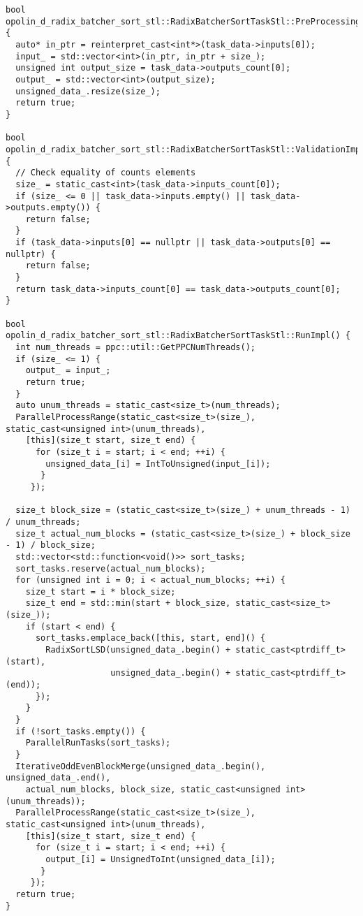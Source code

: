 \documentclass[12pt,a4paper]{extarticle}
\begin{document}
\begin{lstlisting}
bool opolin_d_radix_batcher_sort_stl::RadixBatcherSortTaskStl::PreProcessingImpl() {
  auto* in_ptr = reinterpret_cast<int*>(task_data->inputs[0]);
  input_ = std::vector<int>(in_ptr, in_ptr + size_);
  unsigned int output_size = task_data->outputs_count[0];
  output_ = std::vector<int>(output_size);
  unsigned_data_.resize(size_);
  return true;
}

bool opolin_d_radix_batcher_sort_stl::RadixBatcherSortTaskStl::ValidationImpl() {
  // Check equality of counts elements
  size_ = static_cast<int>(task_data->inputs_count[0]);
  if (size_ <= 0 || task_data->inputs.empty() || task_data->outputs.empty()) {
    return false;
  }
  if (task_data->inputs[0] == nullptr || task_data->outputs[0] == nullptr) {
    return false;
  }
  return task_data->inputs_count[0] == task_data->outputs_count[0];
}

bool opolin_d_radix_batcher_sort_stl::RadixBatcherSortTaskStl::RunImpl() {
  int num_threads = ppc::util::GetPPCNumThreads();
  if (size_ <= 1) {
    output_ = input_;
    return true;
  }
  auto unum_threads = static_cast<size_t>(num_threads);
  ParallelProcessRange(static_cast<size_t>(size_), static_cast<unsigned int>(unum_threads),
    [this](size_t start, size_t end) {
      for (size_t i = start; i < end; ++i) {
        unsigned_data_[i] = IntToUnsigned(input_[i]);
       }
     });

  size_t block_size = (static_cast<size_t>(size_) + unum_threads - 1) / unum_threads;
  size_t actual_num_blocks = (static_cast<size_t>(size_) + block_size - 1) / block_size;
  std::vector<std::function<void()>> sort_tasks;
  sort_tasks.reserve(actual_num_blocks);
  for (unsigned int i = 0; i < actual_num_blocks; ++i) {
    size_t start = i * block_size;
    size_t end = std::min(start + block_size, static_cast<size_t>(size_));
    if (start < end) {
      sort_tasks.emplace_back([this, start, end]() {
        RadixSortLSD(unsigned_data_.begin() + static_cast<ptrdiff_t>(start),
                     unsigned_data_.begin() + static_cast<ptrdiff_t>(end));
      });
    }
  }
  if (!sort_tasks.empty()) {
    ParallelRunTasks(sort_tasks);
  }
  IterativeOddEvenBlockMerge(unsigned_data_.begin(), unsigned_data_.end(),
    actual_num_blocks, block_size, static_cast<unsigned int>(unum_threads));
  ParallelProcessRange(static_cast<size_t>(size_), static_cast<unsigned int>(unum_threads),
    [this](size_t start, size_t end) {
      for (size_t i = start; i < end; ++i) {
        output_[i] = UnsignedToInt(unsigned_data_[i]);
       }
     });
  return true;
}


\end{lstlisting}
\end{document}
